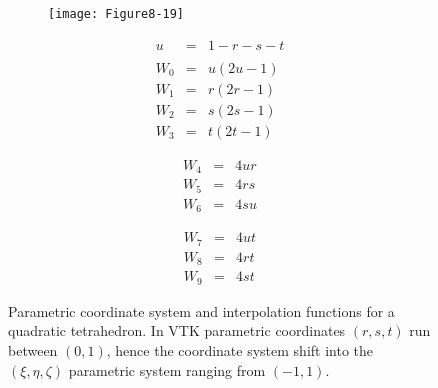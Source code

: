 \begin{figure}[!htb]
	\centering
	\begin{subfigure}{0.48\linewidth}
		\centering
		\texttt{[image: Figure8-19]}
		\caption*{}
	\end{subfigure}
	\hfill
	\begin{subfigure}{0.48\linewidth}
		\centering
		\begin{equation*}
		\begin{array}{lll}
		u &=& 1 - r - s- t \\ \\
		W_0 &=& u(2u-1) \\
		W_1 &=& r(2r - 1) \\
		W_2 &=& s(2s - 1) \\
		W_3 &=& t (2t - 1)	
		\end{array}
		\end{equation*}
		\noindent\begin{minipage}{.5\linewidth}
			\begin{equation*}
			\begin{array}{lll}
			W_4 &=& 4 u r \\
			W_5 &=& 4 r s \\
			W_6 &=& 4 s u	
			\end{array}
			\end{equation*}
		\end{minipage}%
		\noindent\begin{minipage}{.5\linewidth}
			\begin{equation*}
			\begin{array}{lll}
			W_7 &=& 4 u t \\
			W_8 &=& 4 r t \\
			W_9 &=& 4 s t	
			\end{array}
			\end{equation*}
		\end{minipage}%
		
	\end{subfigure}%
	\caption{Parametric coordinate system and interpolation functions for a quadratic tetrahedron. In VTK parametric coordinates $(r,s,t)$ run between $(0,1)$, hence the coordinate system shift into the $(\xi, \eta, \zeta)$ parametric system ranging from $(-1,1)$.}
	\label{fig:Figure8-19}
\end{figure}

